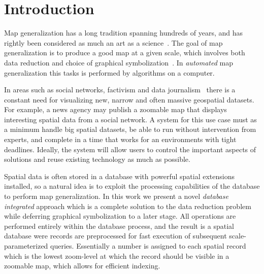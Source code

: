 \section{Introduction}





Map generalization has a long tradition spanning hundreds of years, and has rightly been considered as much an art as a science~\cite{rieger1993consensus}. The goal of map generalization is to produce a good map at a given scale, which involves both data reduction and choice of graphical symbolization~\cite{brassel1988generalization,gruenreich1985cag}.  In \emph{automated} map generalization this tasks is performed by algorithms on a computer.

In areas such as social networks, factivism and data journalism~\cite{cohen2011journalism,bono,sankaranarayanan2009twitterstand} there is a constant need for visualizing new, narrow and often massive geospatial datasets. For example, a news agency may publish a zoomable map that displays interesting spatial data from a social network. A system for this use case must as a minimum handle big spatial datasets, be able to run without intervention from experts, and complete in a time that works for an environments with tight deadlines. Ideally, the system will allow users to control the important aspects of solutions and reuse existing technology as much as possible.

Spatial data is often stored in a database with powerful spatial extensions installed, so a natural idea is to exploit the processing capabilities of the database to perform map generalization. In this work we present a novel \emph{database integrated} approach which is a complete solution to the data reduction problem while deferring graphical symbolization to a later stage. All operations are performed entirely within the database process, and the result is a spatial database were records are preprocessed for fast execution of subsequent scale-parameterized queries. Essentially a number is assigned to each spatial record which is the lowest zoom-level at which the record should be visible in a zoomable map, which allows for efficient indexing.

